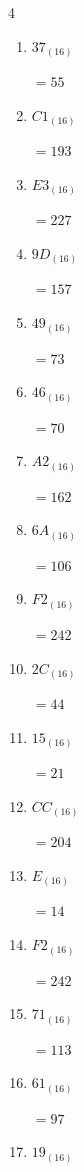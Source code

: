 \begin{multicols}{4}
\begin{enumerate}
  \item $37_{(16)}$

        $=55$

  \item $C1_{(16)}$

        $=193$

  \item $E3_{(16)}$

        $=227$

  \item $9D_{(16)}$

        $=157$

  \item $49_{(16)}$

        $=73$

  \item $46_{(16)}$

        $=70$

  \item $A2_{(16)}$

        $=162$

  \item $6A_{(16)}$

        $=106$

\columnbreak %

  \item $F2_{(16)}$

        $=242$

  \item $2C_{(16)}$

        $=44$

  \item $15_{(16)}$

        $=21$

  \item $CC_{(16)}$

        $=204$

  \item $E_{(16)}$

        $=14$

  \item $F2_{(16)}$

        $=242$

  \item $71_{(16)}$

        $=113$

  \item $61_{(16)}$

        $=97$

  \item $19_{(16)}$


\end{enumerate}
\end{multicols}
